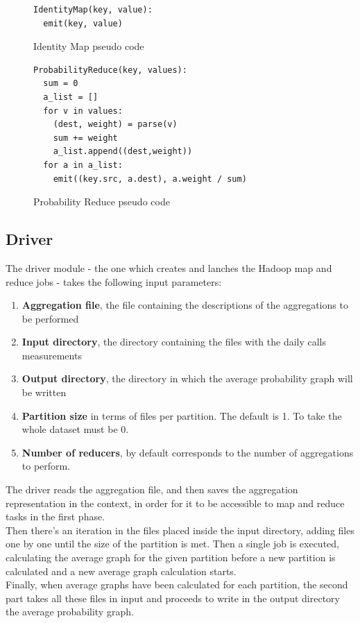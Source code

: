 \begin{figure}
\begin{verbatim}
IdentityMap(key, value):
  emit(key, value)
\end{verbatim}
\caption{Identity Map pseudo code}
\label{fig:identitymap}
\end{figure}
\begin{figure}
\begin{verbatim}
ProbabilityReduce(key, values):
  sum = 0
  a_list = []
  for v in values:
    (dest, weight) = parse(v)
    sum += weight
  	a_list.append((dest,weight))
  for a in a_list:
    emit((key.src, a.dest), a.weight / sum)
\end{verbatim}
\caption{Probability Reduce pseudo code}
\label{fig:probabilityreduce}
\end{figure}
\subsection{Driver}
The driver module - the one which creates and lanches the Hadoop
map and reduce jobs - takes the following input parameters:
\begin{enumerate}
\item \textbf{Aggregation file}, the file containing the descriptions of the aggregations to be performed
\item \textbf{Input directory}, the directory containing the files with the daily calls measurements
\item \textbf{Output directory}, the directory in which the average probability graph will be written
\item \textbf{Partition size} in terms of files per partition. The default is 1. To take the whole dataset must be 0.
\item \textbf{Number of reducers}, by default corresponds to the number of aggregations to perform.
\end{enumerate}
The driver reads the aggregation file, and then saves the aggregation representation in the context, in order for it to be accessible to map and reduce tasks in the first phase.\\
Then there's an iteration in the files placed inside the input directory, adding files one by one until the size of the partition is met.
Then a single job is executed, calculating the average graph for the given partition before a new partition is calculated and a new average graph calculation starts. \\
Finally, when average graphs have been calculated for each partition, the second part takes all these files in input and proceeds to write in the output directory the average probability graph.
